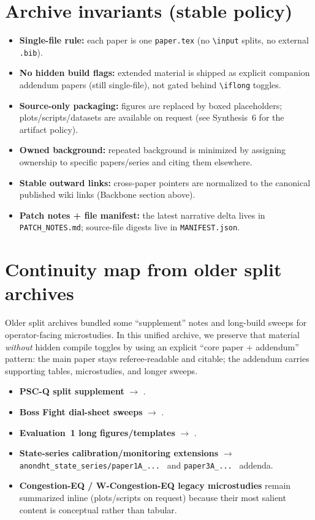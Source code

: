 \documentclass[11pt]{article}
\begin{document}
\section{Archive invariants (stable policy)}
\begin{itemize}[leftmargin=*]
\item \textbf{Single-file rule:} each paper is one \texttt{paper.tex} (no \texttt{\textbackslash input} splits, no external \texttt{.bib}).
\item \textbf{No hidden build flags:} extended material is shipped as explicit companion addendum papers (still single-file), not gated behind \texttt{\textbackslash iflong} toggles.
\item \textbf{Source-only packaging:} figures are replaced by boxed placeholders; plots/scripts/datasets are available on request (see Synthesis~6 for the artifact policy).
\item \textbf{Owned background:} repeated background is minimized by assigning ownership to specific papers/series and citing them elsewhere.
\item \textbf{Stable outward links:} cross-paper pointers are normalized to the canonical published wiki links (Backbone section above).
\item \textbf{Patch notes + file manifest:} the latest narrative delta lives in \texttt{PATCH\_NOTES.md}; source-file digests live in \texttt{MANIFEST.json}.
\end{itemize}

\section{Continuity map from older split archives}
Older split archives bundled some ``supplement'' notes and long-build sweeps for operator-facing microstudies.
In this unified archive, we preserve that material \emph{without} hidden compile toggles by using an explicit ``core paper + addendum'' pattern:
the main paper stays referee-readable and citable; the addendum carries supporting tables, microstudies, and longer sweeps.

\begin{itemize}[leftmargin=*]
\item \textbf{PSC-Q split supplement} $\rightarrow$ .
\item \textbf{Boss Fight dial-sheet sweeps} $\rightarrow$ .
\item \textbf{Evaluation~1 long figures/templates} $\rightarrow$ .
\item \textbf{State-series calibration/monitoring extensions} $\rightarrow$ \texttt{anondht\_state\_series/paper1A\_...\ } and \texttt{paper3A\_...\ } addenda.
\item \textbf{Congestion-EQ / W-Congestion-EQ legacy microstudies} remain summarized inline (plots/scripts on request) because their most salient content is conceptual rather than tabular.
\end{itemize}
\end{document}
